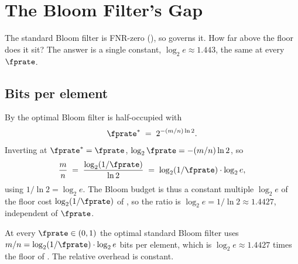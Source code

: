 %

\section{The Bloom Filter's Gap}
\label{sec:bloom-gap}

The standard Bloom filter is FNR-zero (), so
 governs it. How far above the floor does it sit? The
answer is a single constant, $\log_2 e \approx 1.443$, the same at every
$\fprate$.

\subsection*{Bits per element}

By  the optimal Bloom filter is half-occupied with
\begin{equation}
\label{eq:bloom-optimal-fpr-recall}
  \fprate^* \;=\; 2^{-(m/n)\ln 2}.
\end{equation}
Inverting at $\fprate^* = \fprate$, $\log_2 \fprate = -(m/n)\ln 2$, so
\begin{equation}
\label{eq:bloom-bits-per-element}
  \frac{m}{n} \;=\; \frac{\log_2(1/\fprate)}{\ln 2}
  \;=\; \log_2(1/\fprate)\cdot \log_2 e,
\end{equation}
using $1/\ln 2 = \log_2 e$. The Bloom budget is thus a constant multiple
$\log_2 e$ of the floor cost $\log_2(1/\fprate)$ of ,
so the ratio is $\log_2 e = 1/\ln 2 \approx 1.4427$, independent of $\fprate$.

\begin{proposition}
\label{prop:bloom-overhead}
At every $\fprate \in (0,1)$ the optimal standard Bloom filter uses $m/n =
\log_2(1/\fprate)\cdot\log_2 e$ bits per element, which is $\log_2 e \approx
1.4427$ times the floor of . The relative overhead is
constant.
\end{proposition}

